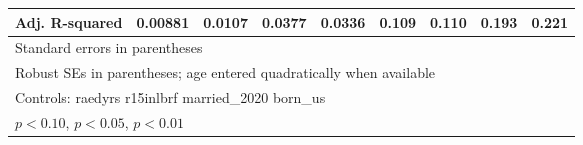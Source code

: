 \begin{table}[htbp]
\begin{tabular}{l*{8}{c}}
Adj. R-squared  &  0.00881         &   0.0107         &   0.0377         &   0.0336         &    0.109         &    0.110         &    0.193         &    0.221         \\
\bottomrule
\multicolumn{9}{l}{\footnotesize Standard errors in parentheses}\\
\multicolumn{9}{l}{\footnotesize Robust SEs in parentheses; age entered quadratically when available}\\
\multicolumn{9}{l}{\footnotesize Controls:  raedyrs r15inlbrf married\_2020 born\_us}\\
\multicolumn{9}{l}{\footnotesize \sym{*} \(p<0.10\), \sym{**} \(p<0.05\), \sym{***} \(p<0.01\)}\\
\end{tabular}
\end{table}
